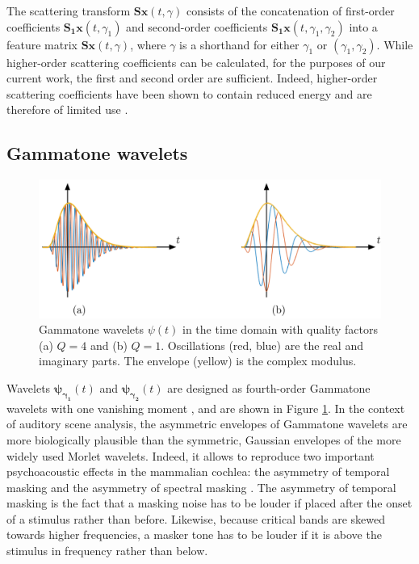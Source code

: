 \documentclass[smallextended]{svjour3}
\begin{document}
The scattering transform $\mathbf{S}\boldsymbol{x}(t,\gamma)$ consists of the concatenation of first-order coefficients $\mathbf{S_1}\boldsymbol{x}(t,\gamma_1)$ and second-order coefficients $\mathbf{S_1}\boldsymbol{x}(t,\gamma_1,\gamma_2)$ into a feature matrix $\mathbf{S}\boldsymbol{x}(t,\gamma)$, where $\gamma$ is a shorthand for either $\gamma_1$ or $(\gamma_1,\gamma_2)$. While higher-order scattering coefficients can be calculated, for the purposes of our current work, the first and second order are sufficient.
Indeed, higher-order scattering coefficients have been shown to contain reduced energy and are therefore of limited use \cite{irene}.

\subsection{Gammatone wavelets}
\begin{figure}
\begin{center}
\includegraphics[width=\columnwidth]{figures/gammatones}
\caption{
\label{fig:gammatones}
Gammatone wavelets $\psi(t)$ in the time domain with quality factors (a) $Q = 4$ and (b) $Q = 1$.
Oscillations (red, blue) are the real and imaginary parts. The envelope (yellow) is the complex modulus.}
\end{center}
\end{figure}
Wavelets
$\boldsymbol{\psi_{\gamma_1}}(t)$ and $\boldsymbol{\psi_{\gamma_2}}(t)$ are designed as fourth-order Gammatone
wavelets with one vanishing moment \cite{Venkitaraman2014}, and are shown in Figure \ref{fig:gammatones}.
In the context of auditory scene analysis, the asymmetric envelopes of Gammatone wavelets are more biologically plausible than the symmetric, Gaussian envelopes of the more widely used Morlet wavelets.
Indeed, it allows to reproduce two important psychoacoustic effects in the mammalian cochlea: the asymmetry of temporal masking and the asymmetry of spectral masking  \cite{Fastl2007}.
The asymmetry of temporal masking is the fact that a masking noise has to be louder if placed after the onset of a stimulus rather than before.
Likewise, because critical bands are skewed towards higher frequencies, a masker tone has to be louder if it is above the stimulus in frequency rather than below.
\end{document}
